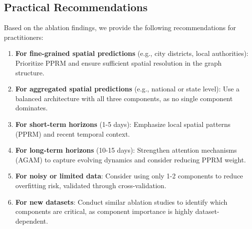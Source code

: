 \documentclass[11pt,a4paper]{article}
\begin{document}
\subsection{Practical Recommendations}

Based on the ablation findings, we provide the following recommendations for practitioners:

\begin{enumerate}
    \item \textbf{For fine-grained spatial predictions} (e.g., city districts, local authorities): Prioritize PPRM and ensure sufficient spatial resolution in the graph structure.
    
    \item \textbf{For aggregated spatial predictions} (e.g., national or state level): Use a balanced architecture with all three components, as no single component dominates.
    
    \item \textbf{For short-term horizons} (1-5 days): Emphasize local spatial patterns (PPRM) and recent temporal context.
    
    \item \textbf{For long-term horizons} (10-15 days): Strengthen attention mechanisms (AGAM) to capture evolving dynamics and consider reducing PPRM weight.
    
    \item \textbf{For noisy or limited data}: Consider using only 1-2 components to reduce overfitting risk, validated through cross-validation.
    
    \item \textbf{For new datasets}: Conduct similar ablation studies to identify which components are critical, as component importance is highly dataset-dependent.
\end{enumerate}
\end{document}
